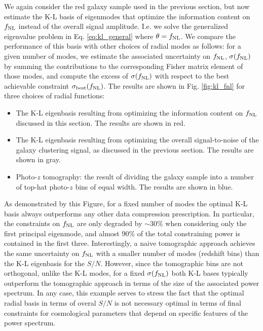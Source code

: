 \documentclass[twocolumn,amsfont,amssymb,amsmath, showpacs,balancelastpage, nofootinbib]{revtex4-1}
\begin{document}
    We again consider the red galaxy sample used in the previous section, but now estimate the K-L basis of eigenmodes that optimize the information content on $f_{\rm NL}$ instead of the overall signal amplitude. I.e. we solve the generalized eigenvalue problem in Eq. \ref{eq:kl_general} where $\theta=f_{\rm NL}$. We compare the performance of this basis with other choices of radial modes as follows: for a given number of modes, we estimate the associated uncertainty on $f_{\rm NL}$, $\sigma(f_{\rm NL})$ by summing the contributions to the corresponding Fisher matrix element of those modes, and compute the excess of $\sigma(f_{\rm NL})$ with respect to the best achievable constraint $\sigma_{\rm best}(f_{\rm NL})$. The results are shown in Fig. \ref{fig:kl_fnl} for three choices of radial functions:
    \begin{itemize}
      \item The K-L eigenbasis resulting from optimizing the information content on $f_{\rm NL}$ discussed in this section. The results are shown in red.
      \item The K-L eigenbasis resulting from optimizing the overall signal-to-noise of the galaxy clustering signal, as discussed in the previous section. The results are shown in gray.
      \item Photo-$z$ tomography: the result of dividing the galaxy sample into a number of top-hat photo-$z$ bins of equal width. The results are shown in blue.
    \end{itemize}
    As demonstrated by this Figure, for a fixed number of modes the optimal K-L basis always outperforms any other data compression prescription. In particular, the constraints on $f_{\rm NL}$ are only degraded by $\sim30\%$ when considering only the first principal eigenmode, and almost 90\% of the total constraining power is contained in the first three. Interestingly, a naive tomographic approach achieves the same uncertainty on $f_{\rm NL}$ with a smaller number of modes (redshift bins) than the K-L eigenbasis for the $S/N$. However, since the tomographic bins are not orthogonal, unlike the K-L modes, for a fixed $\sigma(f_{\rm NL})$ both K-L bases typically outperform the tomographic approach in terms of the size of the associated power spectrum. In any case, this example serves to stress the fact that the optimal radial basis in terms of overal $S/N$ is not necessary optimal in terms of final constraints for cosmological parameters that depend on specific features of the power spectrum.
    
\end{document}
